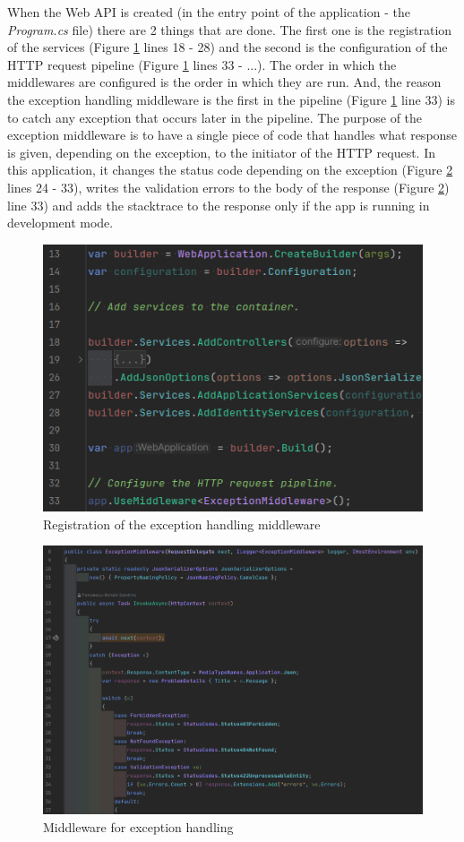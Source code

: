 \par When the Web API is created (in the entry point of the application - the \textit{Program.cs} file) there are 2 things that are done. The first one is the registration of the services (Figure \ref{fig:exception-handling_registration} lines 18 - 28) and the second is the configuration of the HTTP request pipeline (Figure \ref{fig:exception-handling_registration} lines 33 - ...). The order in which the middlewares are configured is the order in which they are run. And, the reason the exception handling middleware is the  first in the pipeline (Figure \ref{fig:exception-handling_registration} line 33) is to catch any exception that occurs later in the pipeline. The purpose of the exception middleware is to have a single piece of code that handles what response is given, depending on the exception, to the initiator of the HTTP request. In this application, it changes the status code depending on the exception (Figure \ref{fig:exception-handling_middleware} lines 24 - 33), writes the validation errors to the body of the response (Figure \ref{fig:exception-handling_middleware}) line  33) and adds the stacktrace to the response only if the app is running in development mode.

\begin{figure}
    \centering
    \includegraphics[width=1\linewidth]{exception-handling_registration.png}
    \caption{Registration of the exception handling middleware}
    \label{fig:exception-handling_registration}
\end{figure}

\begin{figure}
    \centering
    \includegraphics[width=1\linewidth]{exception-handling_middleware.png}
    \caption{Middleware for exception handling}
    \label{fig:exception-handling_middleware}
\end{figure}